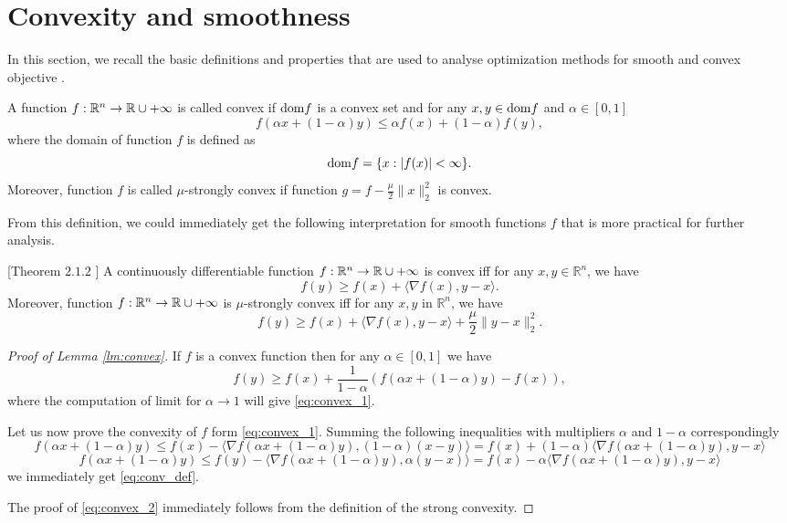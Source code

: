 \section{Convexity and smoothness}\label{sec:basics_conv_and_smoothness}
In this section, we recall the basic definitions and properties that are used to analyse optimization methods for smooth and convex objective \cite{hiriart2012fundamentals}. 
\begin{definition}
A function $f:\mathbb{R}^n\rightarrow \mathbb{R}\cup{+\infty}$ is called convex if $\mathrm{dom} f$ is a convex set and for any $x, y\in \mathrm{dom} f$ and $\alpha \in[0,1]$
\begin{equation}\label{eq:conv_def}
f(\alpha x + (1-\alpha)y)\leq \alpha f(x) + (1-\alpha)f(y),
\end{equation}
where the domain of function $f$ is defined as
$$
\mathrm{dom} f = \{x:|f(x)|<\infty\}.
$$
Moreover, function $f$ is called $\mu$-strongly convex if function $g = f - \frac{\mu}{2}\|x\|_2^2$ is convex.
\end{definition}

From this definition, we could immediately get the following interpretation for smooth functions $f$ that is more practical for further analysis. 

\begin{lemma}\label{lm:convex}[Theorem $2.1.2$ \cite{nesterov-book}]
    A continuously differentiable function $f:\mathbb{R}^n\rightarrow \mathbb{R}\cup{+\infty}$ is convex iff for any $x,y\in\mathbb{R}^n$, we have
    \begin{equation}\label{eq:convex_1}
        f(y) \geq f(x) + \langle \nabla f(x), y-x\rangle.
    \end{equation}
    Moreover, function $f:\mathbb{R}^n\rightarrow \mathbb{R}\cup{+\infty}$ is $\mu$-strongly convex iff for any $x,y$ in $\mathbb{R}^n$, we have
    \begin{equation}\label{eq:convex_2}
        f(y) \geq f(x) + \langle \nabla f(x), y-x\rangle + \frac{\mu}{2}\|y-x\|_2^2.
    \end{equation}
\end{lemma}
\begin{proof}[Proof of Lemma \ref{lm:convex}]
If $f$ is a convex function then for any $\alpha\in[0,1]$ we have 
$$
f(y)\geq f(x) +\frac{1}{1-\alpha}\left(f(\alpha x + (1-\alpha)y) - f(x)\right),
$$
where the computation of limit for $\alpha \rightarrow 1$ will give \eqref{eq:convex_1}.

Let us now prove the convexity of $f$ form \eqref{eq:convex_1}.
Summing the following inequalities with multipliers $\alpha$ and $1-\alpha$ correspondingly
$$
f(\alpha x + (1-\alpha)y) \leq f(x) - \langle \nabla f(\alpha x + (1-\alpha)y), (1-\alpha)(x-y)\rangle = f(x) + (1-\alpha) \langle \nabla f(\alpha x + (1-\alpha)y), y-x\rangle
$$
$$
f(\alpha x + (1-\alpha)y) \leq f(y) - \langle \nabla f(\alpha x + (1-\alpha)y), \alpha(y-x)\rangle = f(x) - \alpha \langle \nabla f(\alpha x + (1-\alpha)y), y-x\rangle
$$
we immediately get \eqref{eq:conv_def}. 

The proof of \eqref{eq:convex_2} immediately follows from the definition of the strong convexity.
\end{proof}

